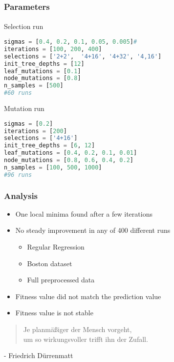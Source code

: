 \documentclass{beamer}
\begin{document}
\begin{frame}[fragile]
\frametitle{Parameters}
\framesubtitle{}
\begin{block}{Selection run}
\begin{lstlisting}[language=Python]
sigmas = [0.4, 0.2, 0.1, 0.05, 0.005]#
iterations = [100, 200, 400]
selections = ['2+2',  '4+16', '4+32', '4,16']
init_tree_depths = [12]
leaf_mutations = [0.1]
node_mutations = [0.8]
n_samples = [500]
#60 runs
\end{lstlisting}
\end{block}

\begin{block}{Mutation run}
\begin{lstlisting}[language=Python]
sigmas = [0.2]
iterations = [200]
selections = ['4+16']
init_tree_depths = [6, 12]
leaf_mutations = [0.4, 0.2, 0.1, 0.01]
node_mutations = [0.8, 0.6, 0.4, 0.2]
n_samples = [100, 500, 1000]
#96 runs
\end{lstlisting}
\end{block}
\end{frame}


\begin{frame}[fragile]
\frametitle{Analysis}

\begin{itemize}
\item One local minima found after a few iterations
\item No steady improvement in any of 400 different runs

\begin{itemize}
\item Regular Regression
\item Boston dataset
\item Full preprocessed data
\end{itemize}

\item Fitness value did not match the prediction value
\item Fitness value is not stable
\end{itemize}

\hbox{}
\hbox{}

\begin{quote}
\hfill Je planmäßiger der Mensch vorgeht,\\
\hfill um so wirkungsvoller trifft ihn der Zufall.\\
\end{quote}
\hfill \small{- Friedrich Dürrenmatt}

\end{frame}
\end{document}
